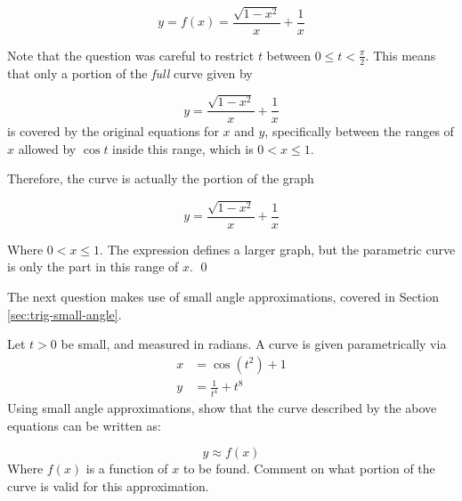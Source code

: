 \begin{solution}
    \[ y = f(x) = \frac{\sqrt{1 - x^2}}{x} + \frac{1}{x} \]

    Note that the question was careful to restrict $t$ between $0\leq t < \frac{\pi}{2}$. This means that only a portion of the \emph{full} curve given by 

    \[y  = \frac{\sqrt{1 - x^2}}{x} + \frac{1}{x}  \]
    is covered by the original equations for $x$ and $y$, specifically between the ranges of $x$ allowed by $\cos t$ inside this range, which is $0 < x \leq 1$.

    Therefore, the curve is actually the portion of the graph 

    \[y  = \frac{\sqrt{1 - x^2}}{x} + \frac{1}{x}  \]

    Where $0 < x \leq 1$. The expression defines a larger graph, but the parametric curve is only the part in this range of $x$.
    \qed
\end{solution}

The next question makes use of small angle approximations, covered in Section \ref{sec:trig-small-angle}.

\begin{example}
    Let $t>0$ be small, and measured in radians. A curve is given parametrically via 
    \begin{align*}
        x &= \cos(t^2) + 1 \\ 
        y &= \frac{1}{t^4} + t^8
    \end{align*}
    Using small angle approximations, show that the curve described by the above equations can be written as:

    \[ y \approx f(x) \]
    Where $f(x)$ is a function of $x$ to be found. Comment on what portion of the curve is valid for this approximation.
\end{example}

